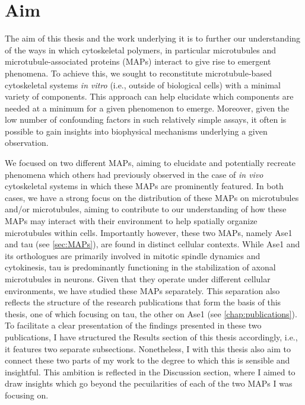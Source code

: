 \chapter{Aim}
The aim of this thesis and the work underlying it is to further our understanding of the ways in which cytoskeletal polymers, in particular microtubules and microtubule-associated proteins (MAPs) interact to give rise to emergent phenomena. To achieve this, we sought to reconstitute microtubule-based cytoskeletal systems \textit{in vitro} (i.e., outside of biological cells) with a minimal variety of components. This approach can help elucidate which components are needed at a minimum for a given phenomenon to emerge. Moreover, given the low number of confounding factors in such relatively simple assays, it often is possible to gain insights into biophysical mechanisms underlying a given observation. \par
We focused on two different MAPs, aiming to elucidate and potentially recreate phenomena which others had previously observed in the case of \textit{in vivo} cytoskeletal systems in which these MAPs are prominently featured. In both cases, we have a strong focus on the distribution of these MAPs on microtubules and/or microtubules, aiming to contribute to our understanding of how these MAPs may interact with their environment to help spatially organize microtubules within cells. Importantly however, these two MAPs, namely Ase1 and tau (see \autoref{sec:MAPs}), are found in distinct cellular contexts. While Ase1 and its orthologues are primarily involved in mitotic spindle dynamics and cytokinesis, tau is predominantly functioning in the stabilization of axonal microtubules in neurons. Given that they operate under different cellular environments, we have studied these MAPs separately. This separation also reflects the structure of the research publications that form the basis of this thesis, one of which focusing on tau, the other on Ase1 (see \autoref{chap:publications}). To facilitate a clear presentation of the findings presented in these two publications, I have structured the Results section of this thesis accordingly, i.e., it features two separate subsections. Nonetheless, I with this thesis also aim to connect these two parts of my work to the degree to which this is sensible and insightful. This ambition is reflected in the Discussion section, where I aimed to draw insights which go beyond the pecuilarities of each of the two MAPs I was focusing on.